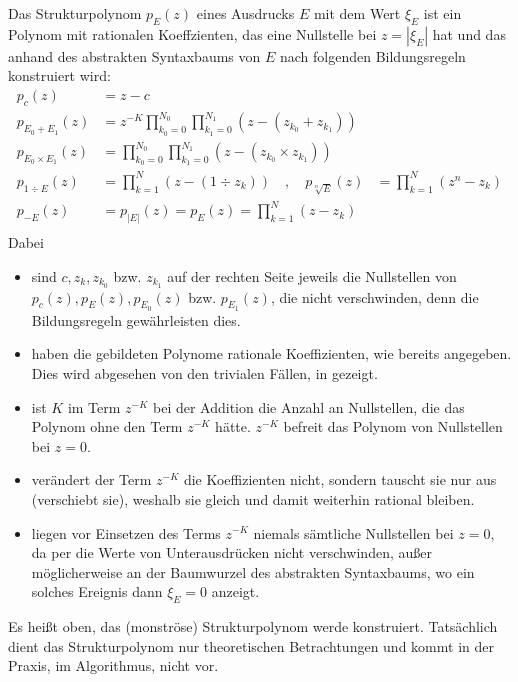 \pagebreak
\begin{definition}[Strukturpolynom]\label{de:Strukturpolynom}
Das Strukturpolynom $p_E(z)$ eines Ausdrucks $E$
mit dem Wert $\xi_E$
ist ein Polynom mit rationalen Koeffzienten,
das eine Nullstelle bei $z=|\xi_E|$ hat
und das anhand des abstrakten Syntaxbaums von $E$
nach folgenden Bildungsregeln konstruiert wird:
\begin{equation*}
\begin{split}
p_{c            }(z) & = z-c \\
p_{E_0+      E_1}(z) & = z^{-K}\prod_{k_0=0}^{N_0}\prod_{k_1=0}^{N_1} (z-(z_{k_0}+z_{k_1})) \\
p_{E_0\times E_1}(z) & = \prod_{k_0=0}^{N_0}\prod_{k_1=0}^{N_1} (z-(z_{k_0}\times z_{k_1}))\\
p_{1  \div   E  }(z) & = \prod_{k=1}^N (z-(1\div z_k)) \quad,\quad
p_{\sqrt[n]{E}  }(z) & = \prod_{k=1}^N (z^n-z_k) \\
p_{-E}(z) & = p_{|E|}(z)  = p_E(z) = \prod_{k=1}^N (z-z_k)\\
\end{split}
\end{equation*}
Dabei
\begin{itemize}
\item sind $c, z_k, z_{k_0}$ bzw. $z_{k_1}$ auf der rechten Seite 
      jeweils die Nullstellen 
      von $p_c(z), p_E(z), p_{E_0}(z)$ bzw. $p_{E_1}(z)$,
      die nicht verschwinden, denn die Bildungsregeln 
	  gewährleisten dies.
\item haben die gebildeten Polynome rationale Koeffizienten,
      wie bereits angegeben. Dies wird 
      abgesehen von den trivialen Fällen, 
	  in  gezeigt.
\item ist $K$ im Term $z^{-K}$ bei der Addition 
      die Anzahl an Nullstellen,
      die das Polynom ohne den Term $z^{-K}$ hätte.
      $z^{-K}$ befreit das Polynom von Nullstellen bei $z=0$.
\item verändert der Term $z^{-K}$ die Koeffizienten nicht,
      sondern tauscht sie nur aus (verschiebt sie), 
	  weshalb sie gleich und damit weiterhin rational bleiben.
\item liegen vor Einsetzen des Terms $z^{-K}$ 
      niemals sämtliche Nullstellen bei $z=0$,
      da per  
      die Werte von Unterausdrücken nicht verschwinden,
      außer möglicherweise an der Baumwurzel 
	  des abstrakten Syntaxbaums,
      wo ein solches Ereignis dann $\xi_E=0$ anzeigt.
\end{itemize}
\begin{note}
Es heißt oben, das (monströse) Strukturpolynom werde konstruiert.
Tatsächlich dient das Strukturpolynom nur theoretischen Betrachtungen
und kommt in der Praxis, im Algorithmus, nicht vor.
\end{note}
\end{definition}


